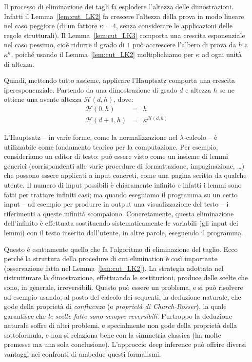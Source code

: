 \documentclass[12pt,a4paper,openright,twoside]{report}
\begin{document}
Il processo di eliminazione dei tagli fa esplodere l'altezza delle dimostrazioni. Infatti il Lemma~\ref{lem:cut_LK2} fa crescere l'altezza della prova in modo lineare nel caso peggiore (di un fattore $\kappa = 4$, senza considerare le applicazioni delle regole strutturali). Il Lemma~\ref{lem:cut_LK3} comporta una crescita esponenziale nel caso pessimo, cio\`e ridurre il grado di $1$ pu\`o accrescere l'albero di prova da $h$ a $\kappa^h$, poich\'e usando il Lemma~\ref{lem:cut_LK2} moltiplichiamo per $\kappa$ ad ogni unit\`a di altezza.

Quindi, mettendo tutto assieme, applicare l'Hauptsatz comporta una crescita iperesponenziale. Partendo da una dimostrazione di grado $d$ e altezza $h$ se ne ottiene una avente altezza $\mathcal{H}(d, h)$, dove:
\begin{eqnarray*}
	\mathcal{H}(0, h) & = & h \\
	\mathcal{H}(d+1, h) & = & \kappa^{\mathcal{H}(d, h)}
\end{eqnarray*}

L'Hauptsatz -- in varie forme, come la normalizzazione nel $\lambda$-calcolo -- \`e utilizzabile come fondamento teorico per la computazione. Per esempio, consideriamo un editor di testo: pu\`o essere visto come un insieme di lemmi generici (corrispondenti alle varie procedure di formattazione, impaginazione, \ldots) che possono essere applicati a input concreti, come una pagina scritta da qualche utente. Il numero di input possibili \`e chiaramente infinito e infatti i lemmi sono fatti per trattare infiniti casi; ma quando eseguiamo il programma su un certo input -- ad esempio per produrre in output una visualizzazione del testo -- i riferimenti a queste infinit\`a scompaiono. Concretamente, questa eliminazione dell'infinito \`e effettuata sostituendo sistematicamente le variabili (gli input dei lemmi) con il testo inserito dall'utente, in altre parole, eseguendo il programma. 

Questo \`e esattamente quello che fa l'algoritmo di eliminazione del taglio. Ecco perch\'e la struttura della procedure di cut elimination \`e cos\`i importante (osservazione fatta nel Lemma~\ref{lem:cut_LK2}). La strategia adottata nel ristrutturare la dimostrazione, effettuando le sostituzioni, produce delle scelte che sono, in generale, irreversibili. Questo pu\`o essere un problema, e si pu\`o risolvere ad esempio usando, al posto del calcolo dei sequenti, la deduzione naturale, che gode della propriet\`a di \emph{confluenza} (o \emph{propriet\`a di Church-Rosser}), la quale garantisce che \emph{le scelte fatte sono sempre reversibili}. Purtroppo la deduzione naturale soffre di altri problemi, e specialmente non gode della propriet\`a della sottoformula, e non si relaziona bene con la simmetria classica (ha molte premesse ma una sola conclusione). L'approccio deep inference pu\`o offrire diversi vantaggi nei confronti di ambedue questi formalismi.
\end{document}
